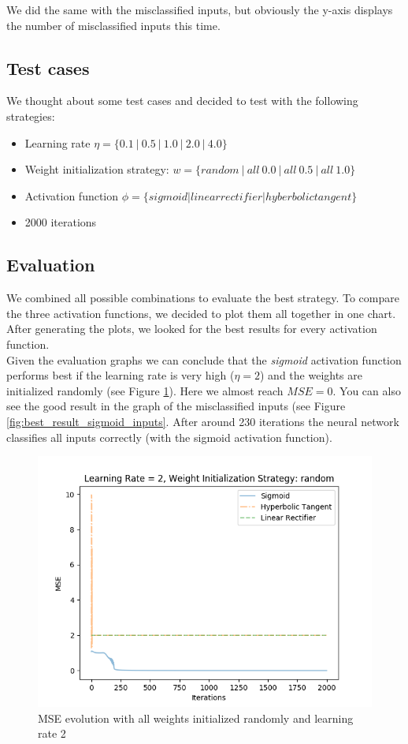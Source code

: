 \documentclass{article}
\begin{document}
We did the same with the misclassified inputs, but obviously the y-axis displays the number of misclassified inputs this time.

\subsection{Test cases}

We thought about some test cases and decided to test with the following strategies:

\begin{itemize}
\item{Learning rate $\eta = \{0.1\ |\ 0.5\ |\ 1.0\ |\ 2.0\ |\ 4.0 \}$}
\item{Weight initialization strategy: $w = \{ random\ |\ all\ 0.0\ |\ all\ 0.5\ |\ all\ 1.0\}$}
\item{Activation function $\phi = \{sigmoid | linear rectifier | hyberbolic tangent\}$}
\item{2000 iterations}
\end{itemize}

\subsection{Evaluation}
We combined all possible combinations to evaluate the best strategy.
To compare the three activation functions, we decided to plot them all together in one chart.
After generating the plots, we looked for the best results for every activation function.
\\

Given the evaluation graphs we can conclude that the \emph{sigmoid} activation function performs best if the learning rate is very high ($\eta = 2$) and the weights are initialized randomly (see Figure \ref{fig:best_result_sigmoid_mse}).  Here we almost reach $MSE = 0$. You can also see the good result in the graph of the misclassified inputs (see Figure \ref{fig:best_result_sigmoid_inputs}. After around 230 iterations the neural network classifies all inputs correctly (with the sigmoid activation function).

\begin{figure}[H]
	\centering
	\includegraphics[width=0.9\linewidth]{img/5/sigmoid-mse.png}
	\caption{MSE evolution with all weights initialized randomly and learning rate 2}
	\label{fig:best_result_sigmoid_mse}
\end{figure}
\end{document}
